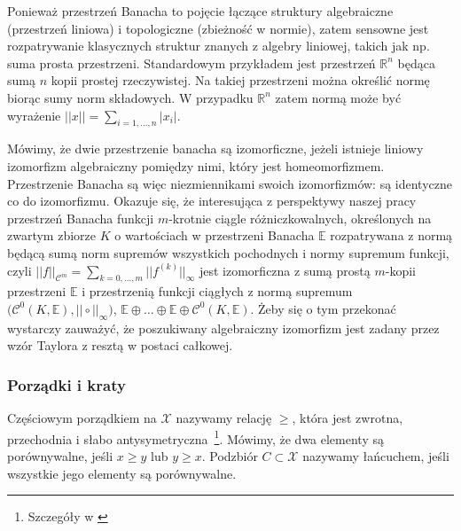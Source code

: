 	Ponieważ przestrzeń Banacha to pojęcie łączące struktury algebraiczne (przestrzeń liniowa) i topologiczne (zbieżność w normie), zatem sensowne jest rozpatrywanie klasycznych struktur znanych z algebry liniowej, takich jak np. suma prosta przestrzeni. Standardowym przykładem jest przestrzeń $\mathbb{R}^{n}$ będąca sumą $n$ kopii prostej rzeczywistej. Na takiej przestrzeni można określić normę biorąc sumy norm składowych. W przypadku $\mathbb{R}^{n}$ zatem normą może być wyrażenie $||x||= \underset{i = 1,\dots,n}\sum |x_i|$. 

	Mówimy, że dwie przestrzenie banacha są izomorficzne, jeżeli istnieje liniowy izomorfizm algebraiczny pomiędzy nimi, który jest homeomorfizmem. Przestrzenie Banacha są więc niezmiennikami swoich izomorfizmów: są identyczne co do izomorfizmu. Okazuje się, że interesująca z perspektywy naszej pracy przestrzeń Banacha funkcji $m$-krotnie ciągle różniczkowalnych, określonych na zwartym zbiorze $K$ o wartościach w przestrzeni Banacha $\mathbb{E}$ rozpatrywana z normą będącą sumą norm supremów wszystkich pochodnych i normy supremum funkcji, czyli $||f||_{\mathcal{C}^{m}} = \underset{k = 0,\dots, m}{\sum} || f^{(k)}||_{\infty}$ jest izomorficzna z sumą prostą $m$-kopii przestrzeni $\mathbb{E}$ i przestrzenią funkcji ciągłych z normą supremum $\Big( \mathcal{C}^0(K,\mathbb{E}), || \circ ||_{\infty}\Big)$, $\mathbb{E} \oplus \dots \oplus \mathbb{E} \oplus \mathcal{C}^0(K,\mathbb{E})$. Żeby się o tym przekonać wystarczy zauważyć, że poszukiwany algebraiczny izomorfizm jest zadany przez wzór Taylora z resztą w postaci całkowej. 


\subsubsection*{Porządki i kraty}

Częściowym porządkiem na $ \mathcal{X} $ nazywamy relację $ \geq $, która jest zwrotna, przechodnia i słabo antysymetryczna~\footnote{Szczegóły w \citet[][str. 20-28]{Turek}}. Mówimy, że dwa elementy są porównywalne, jeśli $ x \geq y $ lub $ y \geq x $. Podzbiór $ C \subset \mathcal{X} $ nazywamy łańcuchem, jeśli wszystkie jego elementy są porównywalne.

